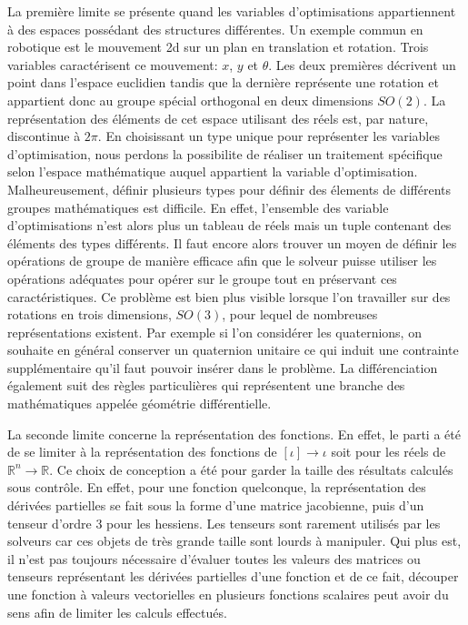 La première limite se présente quand les variables d'optimisations
appartiennent à des espaces possédant des structures différentes. Un
exemple commun en robotique est le mouvement 2d sur un plan en
translation et rotation. Trois variables caractérisent ce mouvement:
$x$, $y$ et $\theta$. Les deux premières décrivent un point dans
l'espace euclidien tandis que la dernière représente une rotation et
appartient donc au groupe spécial orthogonal en deux dimensions $SO(2)$. La représentation
des éléments de cet espace utilisant des réels est, par nature,
discontinue à $2\pi$. En choisissant un type unique pour représenter
les variables d'optimisation, nous perdons la possibilite de réaliser
un traitement spécifique selon l'espace mathématique auquel appartient
la variable d'optimisation. Malheureusement, définir plusieurs types
pour définir des élements de différents groupes mathématiques est
difficile. En effet, l'ensemble des variable d'optimisations n'est
alors plus un tableau de réels mais un tuple contenant des éléments
des types différents. Il faut encore alors trouver un moyen de définir
les opérations de groupe de manière efficace afin que le solveur
puisse utiliser les opérations adéquates pour opérer sur le groupe
tout en préservant ces caractéristiques. Ce problème est bien plus
visible lorsque l'on travailler sur des rotations en trois dimensions,
$SO(3)$, pour lequel de nombreuses représentations existent. Par
exemple si l'on considérer les quaternions, on souhaite en général
conserver un quaternion unitaire ce qui induit une contrainte
supplémentaire qu'il faut pouvoir insérer dans le problème. La
différenciation également suit des règles particulières qui
représentent une branche des mathématiques appelée géométrie
différentielle.

La seconde limite concerne la représentation des fonctions. En effet,
le parti a été de se limiter à la représentation des fonctions de
$[\iota] \rightarrow \iota$ soit pour les réels de $\mathbb{R}^n
\rightarrow \mathbb{R}$. Ce choix de conception a été pour garder la
taille des résultats calculés sous contrôle. En effet, pour une
fonction quelconque, la représentation des dérivées partielles se fait
sous la forme d'une matrice jacobienne, puis d'un
tenseur d'ordre 3 pour les hessiens. Les tenseurs sont
rarement utilisés par les solveurs car ces objets de très grande
taille sont lourds à manipuler. Qui plus est, il n'est pas toujours
nécessaire d'évaluer toutes les valeurs des matrices ou tenseurs
représentant les dérivées partielles d'une fonction et de ce fait,
découper une fonction à valeurs vectorielles en plusieurs fonctions
scalaires peut avoir du sens afin de limiter les calculs effectués.


